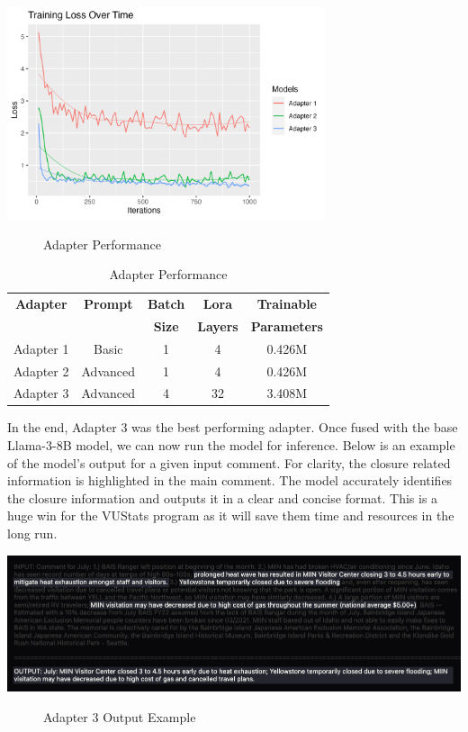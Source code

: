 \documentclass[12pt]{article}
\begin{document}
\begin{center}
    \includegraphics[width=0.7\textwidth]{../Visuals/Loss.png}
    \begin{figure}[H]
        \caption{Adapter Performance}
    \end{figure}
\end{center}

\begin{center}
    \begin{table}[H]
        \centering
        \begin{tabular}{|c|c|c|c|c|}
            \hline
            \textbf{Adapter} & \textbf{Prompt} & \textbf{Batch} & \textbf{Lora} & \textbf{Trainable} \\
             & & \textbf{Size} & \textbf{Layers} &  \textbf{Parameters}\\
            \hline
            Adapter 1 & Basic & 1 & 4 & 0.426M \\
            \hline
            Adapter 2 & Advanced & 1 & 4 & 0.426M \\
            \hline
            Adapter 3 & Advanced & 4 & 32 & 3.408M \\
            \hline
            \end{tabular}
        \caption{Adapter Performance}
    \end{table}
\end{center}
In the end, Adapter 3 was the best performing adapter. Once fused with the base Llama-3-8B model, we can now run the model for inference. Below is an example of the model's output for a given input comment. For clarity, the closure related information is highlighted in the main comment. The model accurately identifies the closure information and outputs it in a clear and concise format. This is a huge win for the VUStats program as it will save them time and resources in the long run.

\begin{center}
    \includegraphics[width=1\textwidth]{../Visuals/OutputExample.png}
    \begin{figure}[H]
        \caption{Adapter 3 Output Example}
    \end{figure}
\end{center}
\end{document}

